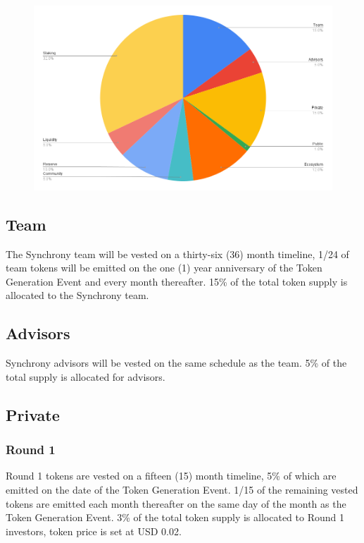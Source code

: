 \documentclass[10pt]{article}
\begin{document}
					\begin{center}
						\begin{figure}[h]
							\includegraphics[scale=0.5]{allocation.png}
							\centering
						\end{figure}
					\end{center}

					\subsection{Team}
					The Synchrony team will be vested on a thirty-six (36) month timeline, 1/24 of
					team tokens will be emitted on the one (1) year anniversary of the Token
					Generation Event and every month thereafter. 15\% of the total token supply is allocated
					to the Synchrony team.

					\subsection{Advisors}
					Synchrony advisors will be vested on the same schedule as the team. 5\% of the
					total supply is allocated for advisors.

					\subsection{Private}
					\subsubsection{Round 1}
					Round 1 tokens are vested on a fifteen (15) month timeline, 5\% of which are
					emitted on the date of the Token Generation Event. 1/15 of the remaining vested
					tokens are emitted each month thereafter on the same day of the month as the
					Token Generation Event. 3\% of the total token supply is allocated to Round
					1 investors, token price is set at USD 0.02.
\end{document}
